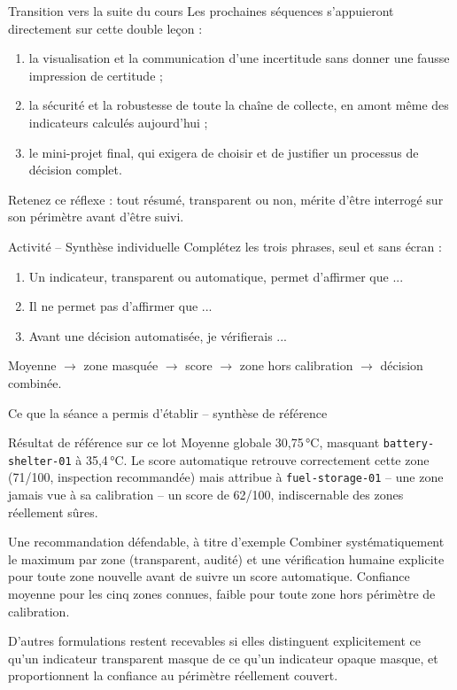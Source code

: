 \documentclass[aspectratio=169]{beamer}
\begin{document}
\begin{frame}{Transition vers la suite du cours}
  Les prochaines séquences s'appuieront directement sur cette double leçon :
  \begin{enumerate}
    \item la visualisation et la communication d'une incertitude sans donner une fausse impression de certitude ;
    \item la sécurité et la robustesse de toute la chaîne de collecte, en amont même des indicateurs calculés aujourd'hui ;
    \item le mini-projet final, qui exigera de choisir et de justifier un processus de décision complet.
  \end{enumerate}
  \vfill
  Retenez ce réflexe : tout résumé, transparent ou non, mérite d'être interrogé sur son périmètre avant d'être suivi.
\end{frame}

\begin{frame}{Activité -- Synthèse individuelle}
  Complétez les trois phrases, seul et sans écran :
  \begin{enumerate}
    \item Un indicateur, transparent ou automatique, permet d'affirmer que ...
    \item Il ne permet pas d'affirmer que ...
    \item Avant une décision automatisée, je vérifierais ...
  \end{enumerate}
  \vfill
  \alert{Moyenne $\rightarrow$ zone masquée $\rightarrow$ score $\rightarrow$ zone hors calibration $\rightarrow$ décision combinée.}
\end{frame}

\begin{frame}{Ce que la séance a permis d'établir -- synthèse de référence}
  \small
  \begin{block}{Résultat de référence sur ce lot}
    Moyenne globale 30,75\,°C, masquant \texttt{battery-shelter-01} à 35,4\,°C. Le score automatique retrouve correctement cette zone (71/100, inspection recommandée) mais attribue à \texttt{fuel-storage-01} -- une zone jamais vue à sa calibration -- un score de 62/100, indiscernable des zones réellement sûres.
  \end{block}
  \begin{block}{Une recommandation défendable, à titre d'exemple}
    Combiner systématiquement le maximum par zone (transparent, audité) et une vérification humaine explicite pour toute zone nouvelle avant de suivre un score automatique. Confiance moyenne pour les cinq zones connues, faible pour toute zone hors périmètre de calibration.
  \end{block}
  \normalsize
  \alert{D'autres formulations restent recevables si elles distinguent explicitement ce qu'un indicateur transparent masque de ce qu'un indicateur opaque masque, et proportionnent la confiance au périmètre réellement couvert.}
\end{frame}
\end{document}
